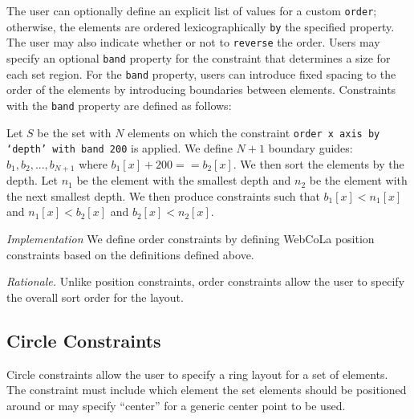 The user can optionally define an explicit list of values for a custom
\texttt{order}; otherwise, the elements are ordered lexicographically \texttt{by}
the specified property. The user may also indicate whether
or not to \texttt{reverse} the order. Users may specify an optional
\texttt{band} property for the constraint that determines a size for each
set region. For the \texttt{band} property, users can introduce fixed spacing
to the order of the elements by introducing boundaries between elements.
Constraints with the \texttt{band} property are defined as follows:

\begin{definition}
Let $S$ be the set with $N$ elements on which the constraint 
\texttt{order x axis by `depth' with band 200} is applied.
We define $N+1$ boundary guides: $b_1, b_2, ..., b_{N+1}$ where
$b_1[x] + 200 == b_2[x]$. We then sort the elements by the depth.
Let $n_1$ be the element with the smallest depth and $n_2$ be the element 
with the next smallest depth. We then produce constraints such that
$b_1[x] < n_1[x]$ and $n_1[x] < b_2[x]$ and $b_2[x] < n_2[x]$.
\end{definition}

\emph{Implementation}
We define order constraints by defining WebCoLa position constraints based
on the definitions defined above. 


\emph{Rationale.} Unlike position constraints, order constraints allow the
user to specify the overall sort order for the layout.

\subsection{Circle Constraints}

Circle constraints allow the user to specify a ring layout for a set of
elements. The constraint must include which element the set elements should
be positioned around or may specify ``center'' for a generic center point
to be used.



